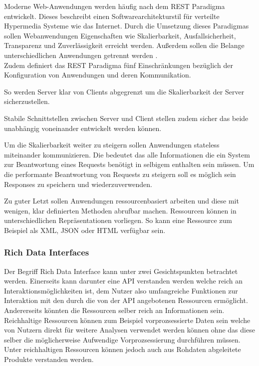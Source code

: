 Moderne Web-Anwendungen werden häufig nach dem REST Paradigma entwickelt. Dieses beschreibt einen 
Softwarearchitekturstil für verteilte Hypermedia Systeme wie das Internet. Durch die Umsetzung dieses Paradigmas sollen Webanwendungen Eigenschaften wie 
Skalierbarkeit, Ausfallsicherheit, Transparenz und Zuverlässigkeit erreicht werden. Außerdem sollen die Belange unterschiedlichen Anwendungen getrennt werden \cite{testbed_11}.\\ 
Zudem definiert das REST Paradigma fünf Einschränkungen bezüglich der Konfiguration von Anwendungen und deren Kommunikation. 

So werden Server klar von Clients abgegrenzt um die Skalierbarkeit der Server sicherzustellen. 

Stabile Schnittstellen zwischen Server und Client stellen zudem sicher das beide unabhängig voneinander entwickelt werden können. 

Um die Skalierbarkeit weiter zu steigern sollen Anwendungen stateless miteinander kommunizieren. 
Die bedeutet das alle Informationen die ein System zur Beantwortung eines Requests benötigt in selbigem enthalten sein müssen. 
Um die performante Beantwortung von Requests zu steigern soll es möglich sein Responses zu speichern und wiederzuverwenden. 

Zu guter Letzt sollen Anwendungen ressourcenbasiert arbeiten und diese mit wenigen, klar definierten Methoden abrufbar machen. 
Ressourcen können in unterschiedlichen Repräsentationen vorliegen. So kann eine Ressource zum Beispiel als XML, JSON oder HTML verfügbar sein.
\subsubsection{Rich Data Interfaces}
Der Begriff Rich Data Interface kann unter zwei Gesichtspunkten betrachtet werden. Einerseits kann darunter eine API verstanden werden welche 
reich an Interaktionsmöglichkeiten ist, dem Nutzer also umfangreiche Funktionen zur Interaktion mit den durch die von der API angebotenen Ressourcen ermöglicht.
Andererseits könnten die Ressourcen selber reich an Informationen sein. Reichhaltige Ressourcen können zum Beispiel vorprozsessierte Daten 
sein welche von Nutzern direkt für weitere Analysen verwendet werden können ohne das diese selber die möglicherweise Aufwendige Vorprozsessierung durchführen müssen.\\ 
Unter reichhaltigen Ressourcen können jedoch auch aus Rohdaten abgeleitete Produkte verstanden werden. 

